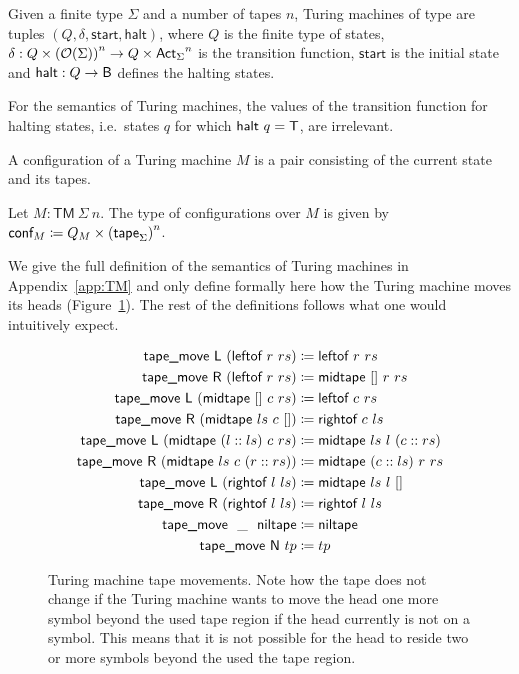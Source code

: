 \begin{definition}
  Given a finite type $\Sigma$ and a number of tapes $n$, Turing machines of type  are tuples $(Q, \delta, \textsf{start}, \textsf{halt})$, where $Q$ is the finite type of states, $\delta : Q \times {(\mathcal{O}{(\Sigma)})}^n \rightarrow Q \times {\textsf{Act}_\Sigma}^n$ is the transition function, $\textsf{start}$ is the initial state and $\textsf{halt} : Q \rightarrow \textsf{B}$ defines the halting states.
\end{definition}
For the semantics of Turing machines, the values of the transition function for halting states, i.e.\ states $q$ for which $\textsf{halt}~q = \mathsf{T}$, are irrelevant. 

A configuration of a Turing machine $M$ is a pair consisting of the current state and its tapes.
\begin{definition}[Configurations]
  Let $M : \textsf{TM}~\Sigma~n$. The type of configurations over $M$ is given by 
  $\textsf{conf}_{M} \coloneqq Q_{M} \times {(\textsf{tape}_{\Sigma})}^n$.
\end{definition}

We give the full definition of the semantics of Turing machines in Appendix~\ref{app:TM} and only define formally here how the Turing machine moves its heads (Figure~\ref{fig:movetape}). The rest of the definitions follows what one would intuitively expect.

\newcommand{\tmleftof}{\textsf{leftof}}
\newcommand{\tmrightof}{\textsf{rightof}}
\newcommand{\tmniltape}{\textsf{niltape}}
\newcommand{\tmmidtape}{\textsf{midtape}}
\newcommand{\tapemove}{\textsf{tape\_move}}
\begin{figure}
  \begin{align*}
    \tapemove~\movel~(\tmleftof~r~rs) &\defeq \tmleftof~r~rs \\
    \tapemove~\mover~(\tmleftof~r~rs) &\defeq \tmmidtape~\nil~r~rs \\
    \tapemove~\movel~(\tmmidtape~\nil~c~rs) &\defeq \tmleftof~c~rs \\
    \tapemove~\mover~(\tmmidtape~ls~c~\nil) &\defeq \tmrightof~c~ls \\
    \tapemove~\movel~(\tmmidtape~(l::ls)~c~rs) &\defeq \tmmidtape~ls~l~(c ::rs) \\
    \tapemove~\mover~(\tmmidtape~ls~c~(r::rs)) &\defeq \tmmidtape~(c::ls)~r~rs \\
    \tapemove~\movel~(\tmrightof~l~ls) &\defeq \tmmidtape~ls~l~\nil \\
    \tapemove~\mover~(\tmrightof~l~ls) &\defeq \tmrightof~l~ls \\
    \tapemove~~\_~~\tmniltape &\defeq \tmniltape \\
    \tapemove~\moven~tp &\defeq tp
  \end{align*}
  \caption{Turing machine tape movements. Note how the tape does not change if the Turing machine wants to move the head one more symbol beyond the used tape region if the head currently is not on a symbol. This means that it is not possible for the head to reside two or more symbols beyond the used the tape region.}\label{fig:movetape}
\end{figure}

